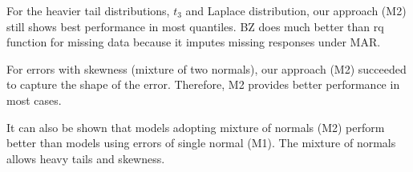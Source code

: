 \documentclass[useAMS,usenatbib,referee]{biom}
\begin{document}
For the heavier tail distributions, $t_3$ and Laplace distribution,
our approach (M2) still shows best performance in most quantiles.
BZ does much better than rq function for missing data because it imputes missing responses under MAR.

For errors with skewness (mixture of two normals), our approach (M2) succeeded to capture the shape of the error.
Therefore, M2 provides better performance in most cases.

It can also be shown that models adopting mixture of normals (M2) perform better than models using errors of single normal (M1).
The mixture of normals allows heavy tails and skewness.

\end{document}
